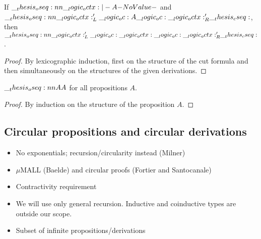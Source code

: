\begin{theorem}
  If $\oseq{\octx |- A}$ and $\oseq{\octx'_L \oc A \oc \octx'_R |- \cseq}$, then $\oseq{\octx'_L \oc \octx \oc \octx'_R |- \cseq}$.
\end{theorem}
\begin{proof}
  By lexicographic induction, first on the structure of the cut formula and then simultaneously on the structures of the given derivations.
\end{proof}

\begin{theorem}
  $\oseq{A |- A}$ for all propositions $A$.
\end{theorem}
\begin{proof}
  By induction on the structure of the proposition $A$.
\end{proof}

\subsection{Circular propositions and circular derivations}

\begin{itemize}
\item No exponentials; recursion/circularity instead (Milner)
\item $\mu$MALL (Baelde) and circular proofs (Fortier and Santocanale)
\item Contractivity requirement
\item We will use only general recursion.
  Inductive and coinductive types are outside our scope.
\item Subset of infinite propositions/derivations
\end{itemize}

